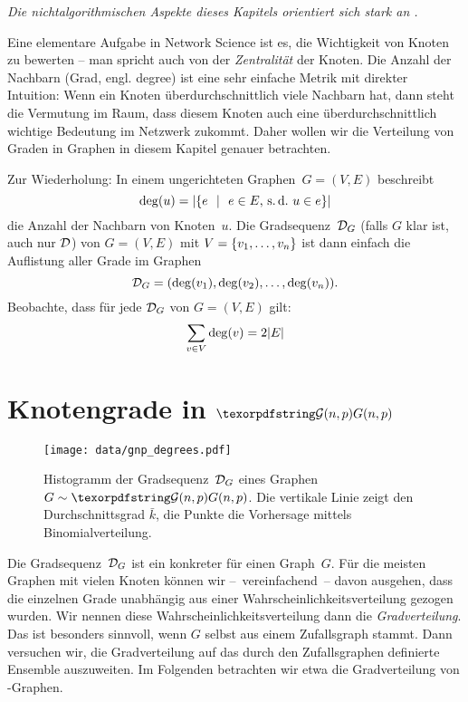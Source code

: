 \emph{Die nichtalgorithmischen Aspekte dieses Kapitels orientiert sich stark an \cite{barabasi2014network}.}
\bigskip

Eine elementare Aufgabe in Network Science ist es, die Wichtigkeit von Knoten zu bewerten -- man spricht auch  von der \emph{Zentralität} der Knoten.
Die Anzahl der Nachbarn (Grad, engl. degree) ist eine sehr einfache Metrik mit direkter Intuition:
Wenn ein Knoten überdurchschnittlich viele Nachbarn hat, dann steht die Vermutung im Raum, dass diesem Knoten auch eine überdurchschnittlich wichtige Bedeutung im Netzwerk zukommt.
Daher wollen wir die Verteilung von Graden in Graphen in diesem Kapitel genauer betrachten.

Zur Wiederholung:
In einem ungerichteten Graphen~$G=(V,E)$ beschreibt
\begin{equation}
    \deg(u) = \card{\twoset{e}{e \in E\text{, \sd\ } u \in e}}
\end{equation}
die Anzahl der Nachbarn von Knoten~$u$.
Die  Gradsequenz~$\mathcal{D}_G$ (falls $G$ klar ist, auch nur $\mathcal{D}$) von $G=(V,E)$ mit $V=\left\{v_1, \ldots, v_n\right\}$ ist dann einfach die Auflistung aller Grade im Graphen
\begin{equation}
    \mathcal{D}_G = (\deg(v_1), \deg(v_2), \ldots, \deg(v_n)).
\end{equation}
Beobachte, dass für jede $\mathcal{D}_G$ von $G=(V,E)$ gilt:
\begin{equation}
    \sum_{v \in V} \deg(v) = 2 \lvert E\rvert
\end{equation}


\section{Knotengrade in $\Gnp$}
\begin{figure}
    \begin{center}
        \texttt{[image: data/gnp\_degrees.pdf]}
    \end{center}
    \caption{
        Histogramm der Gradsequenz~$\mathcal{D}_G$ eines Graphen~$G \sim \Gnp$.
        Die vertikale Linie zeigt den Durchschnittsgrad $\bar k$,
        die Punkte die Vorhersage mittels Binomialverteilung.
    }
    \label{fig:histogram_grade_gnp}
\end{figure}

Die Gradsequenz~$\mathcal{D}_G$ ist ein konkreter  für einen Graph~$G$.
Für die meisten Graphen mit vielen Knoten können wir --~vereinfachend~-- davon ausgehen, dass die einzelnen Grade unabhängig aus einer Wahrscheinlichkeitsverteilung gezogen wurden.
Wir  nennen diese Wahrscheinlichkeitsverteilung dann die \emph{Gradverteilung}.
Das ist besonders sinnvoll, wenn $G$ selbst aus einem Zufallsgraph stammt.
Dann versuchen wir, die Gradverteilung auf das durch den Zufallsgraphen definierte Ensemble auszuweiten.
Im Folgenden betrachten wir etwa die Gradverteilung von \Gnp-Graphen.

